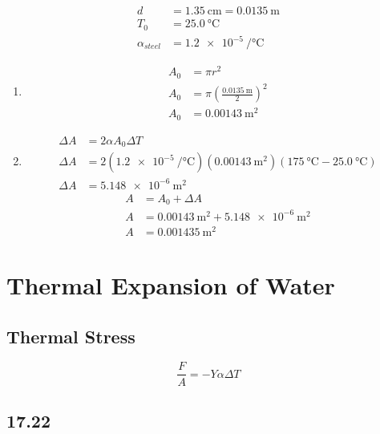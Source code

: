 \documentclass{article}
\begin{document}
\begin{align*}
	d & = \SI{1.35}{\centi \meter} = \SI{0.0135}{\meter} \\
	T_0 & = \SI{25.0}{\celsius} \\
	\alpha_{steel} & = \SI{1.2e-5}{\per \celsius}
\end{align*}
\begin{enumerate}[label = \textbf{(\alph*)}]
	\item
		\begin{align*}
			A_0 & = \pi r^2 \\
			A_0 & = \pi \left( \frac{ \SI{0.0135}{\meter} }{ 2 } \right)^2 \\
			A_0 & = \SI{0.00143}{\meter \squared}
		\end{align*}
	\item
		\begin{align*}
			\Delta A & = 2\alpha A_0\Delta T \\
			\Delta A & = 2(\SI{1.2e-5}{\per \celsius})(\SI{0.00143}{\meter \squared})(\SI{175}{\celsius} - \SI{25.0}{\celsius}) \\
			\Delta A & = \SI{5.148e-6}{\meter \squared}
		\end{align*}
		\begin{align*}
			A & = A_0 + \Delta A \\
			A & = \SI{0.00143}{\meter \squared} + \SI{5.148e-6}{\meter \squared} \\
			A & = \SI{0.001435}{\meter \squared}
		\end{align*}
\end{enumerate}

\section{Thermal Expansion of Water}

\subsection{Thermal Stress}

\begin{equation}
	\frac{ F }{ A } = -Y\alpha \Delta T
\end{equation}

\subsection{17.22}
\end{document}
